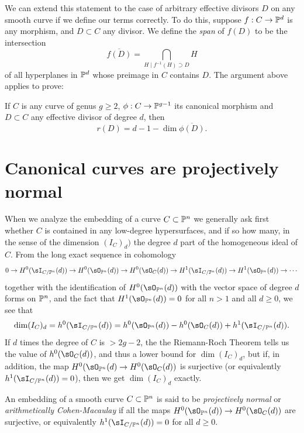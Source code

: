 We can extend this statement to the case of arbitrary effective divisors $D$ on any smooth curve if we define our terms correctly. To do this, suppose $f : C \to \PP^d$ is any morphism, and $D \subset C$ any divisor. We define the \emph{span} of  $f(D)$ to be the intersection
$$
\overline{f(D)} = \bigcap_{H \mid f^{-1}(H)\supset D} H 
$$
of all hyperplanes in $\PP^d$ whose preimage in $C$ contains $D$. The argument above applies to prove:

\begin{theorem}\label{geometric RR}
If $C$ is any curve of genus $g \geq 2$,  $\phi : C \to \PP^{g-1}$ its canonical morphism and $D \subset C$ any effective divisor of degree $d$, then
$$
r(D) = d - 1 - \dim \overline{\phi(D)}.
$$
\end{theorem}
 
 \section{Canonical curves are projectively normal}\label{Noether theorem section}

When we analyze the embedding of a curve $C\subset \PP^n$ we generally ask first whether $C$ is contained in any low-degree
hypersurfaces, and if so how many, in the sense of the dimension $(I_C)_d)$ the degree $d$ part of the homogeneous ideal of $C$.
From the long exact sequence in cohomology
$$
0\to H^0(\sI_{C/\PP^n}(d)) \to H^0(\sO_{\PP^n}(d)) \to H^0(\sO_C(d)) \to H^1(\sI_{C/\PP^n}(d)) \to H^1(\sO_{\PP^n}(d)) \to\cdots
$$
together with the identification of $H^0(\sO_{\PP^n}(d))$ with the vector space of degree $d$ forms on $\PP^n$, and  the fact that
 $H^1(\sO_{\PP^n}(d)) = 0$ for all $n>1$ and all $d\geq 0$, we see that
 $$
 \dim (I_C)_d = h^0(\sI_{C/\PP^n}(d)) = h^0(\sO_{\PP^n}(d)) - h^0(\sO_C(d)) + h^1(\sI_{C/\PP^n}(d)).
$$
If $d$ times the degree of $C$ is $>2g-2$, the the Riemann-Roch Theorem tells us the value of
 $h^0(\sO_C(d))$, and thus a lower bound for $ \dim (I_C)_d$, but if, in addition, the map
 $H^0(\sO_{\PP^n}(d) \to H^0(\sO_C(d))$ is surjective (or equivalently $h^1(\sI_{C/\PP^n}(d))=0$),
 then we get $ \dim (I_C)_d$ exactly.
 
 
\begin{definition} An embedding of a smooth curve
$C\subset \PP^n$ is said to be \emph{projectively normal} or \emph{arithmetically Cohen-Macaulay} if all the maps $H^0(\sO_{\PP^n}(d)) \to H^0(\sO_C(d))$ are surjective,
or equivalently $h^1(\sI_{C/\PP^n}(d))=0$ for all $d\geq 0$.
\end{definition}
 
